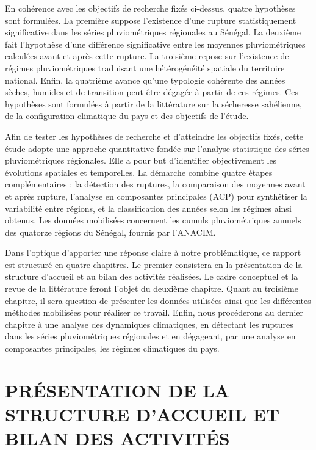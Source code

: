 \documentclass[12pt,a4paper]{report}
\begin{document}
En cohérence avec les objectifs de recherche fixés ci-dessus, quatre hypothèses sont formulées. La première suppose l'existence d'une rupture statistiquement significative dans les séries pluviométriques régionales au Sénégal. La deuxième fait l'hypothèse d'une différence significative entre les moyennes pluviométriques calculées avant et après cette rupture. La troisième repose sur l'existence de régimes pluviométriques traduisant une hétérogénéité spatiale du territoire national. Enfin, la quatrième avance qu'une typologie cohérente des années sèches, humides et de transition peut être dégagée à partir de ces régimes. Ces hypothèses sont formulées à partir de la littérature sur la sécheresse sahélienne, de la configuration climatique du pays et des objectifs de l’étude.

Afin de tester les hypothèses de recherche et d’atteindre les objectifs fixés, cette étude adopte une approche quantitative fondée sur l’analyse statistique des séries pluviométriques régionales. Elle a pour but d’identifier objectivement les évolutions spatiales et temporelles. La démarche combine quatre étapes complémentaires : la détection des ruptures, la comparaison des moyennes avant et après rupture, l’analyse en composantes principales (ACP) pour synthétiser la variabilité entre régions, et la classification des années selon les régimes ainsi obtenus. Les données mobilisées concernent les cumuls pluviométriques annuels des quatorze régions du Sénégal, fournis par l'ANACIM.

Dans l’optique d’apporter une réponse claire à notre problématique, ce rapport est structuré en quatre chapitres. Le premier consistera en la présentation de la structure d’accueil et au bilan des activités réalisées. Le cadre conceptuel et la revue de la littérature feront l’objet du deuxième chapitre. Quant au troisième chapitre, il sera question de présenter les données utilisées ainsi que les différentes méthodes mobilisées pour réaliser ce travail. Enfin, nous procéderons au dernier chapitre à une analyse des dynamiques climatiques, en détectant les ruptures dans les séries pluviométriques régionales et en dégageant, par une analyse en composantes principales, les régimes climatiques du pays.

\chapter{PRÉSENTATION DE LA STRUCTURE D'ACCUEIL ET BILAN DES ACTIVITÉS}
\end{document}
